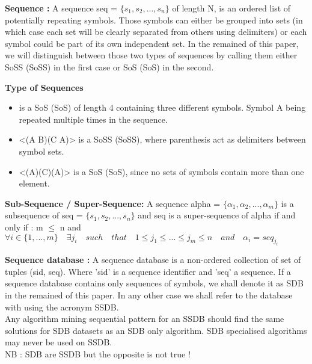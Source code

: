 \documentclass{eplmastersthesis}
\begin{document}
\begin{definition}{\bfseries Sequence :}
A sequence seq = $\{s_1, s_2, ..., s_n\}$ of length N, is an ordered list of potentially repeating symbols. Those symbols can either be grouped into sets (in which case each set will be clearly separated from others using delimiters) or each symbol could be part of its own independent set. In the remained of this paper, we will distinguish between those two types of sequences by calling them either \acrlong{SoSS} (\acrshort{SoSS}) in the first case or \acrlong{SoS} (\acrshort{SoS}) in the second.
\end{definition}

\begin{example}{\bfseries Type of Sequences}
\begin{itemize}
\item  <A B C A> is a \acrlong{SoS} (\acrshort{SoS}) of length 4 containing three different symbols. Symbol A being repeated multiple times in the sequence.
\item <(A B)(C A)> is a \acrlong{SoSS} (\acrshort{SoSS}), where parenthesis act as delimiters between symbol sets.
\item <(A)(C)(A)> is a \acrlong{SoS} (\acrshort{SoS}), since no sets of symbols contain more than one element.
\end{itemize}
\end{example}

\begin{definition}{\bfseries Sub-Sequence / Super-Sequence:}
A sequence alpha = $\{\alpha_1, \alpha_2, ..., \alpha_m\}$ is a subsequence of seq = $\{s_1, s_2, ..., s_n\}$ and seq is a super-sequence of alpha if and only if : m $\leq$ n and $\forall i \in \{1, ..., m\} \quad \exists j_i \quad such \quad that \quad 1 \leq j_1 \leq ... \leq j_m \leq n \quad and \quad \alpha_i = seq_{j_i}$
\end{definition}

\begin{definition}{\bfseries Sequence database :}
A sequence database is a non-ordered collection of set of tuples (sid, seq). Where 'sid' is a sequence identifier and 'seq' a sequence. If a sequence database contains only sequences of symbols, we shall denote it as SDB in the remained of this paper. In any other case we shall refer to the database with using the acronym SSDB. \\
Any algorithm mining sequential pattern for an SSDB should find the same solutions for SDB datasets as an SDB only algorithm. SDB specialised algorithms may never be used on SSDB. \\
NB : SDB are SSDB but the opposite is not true ! 
\end{definition}
\end{document}
